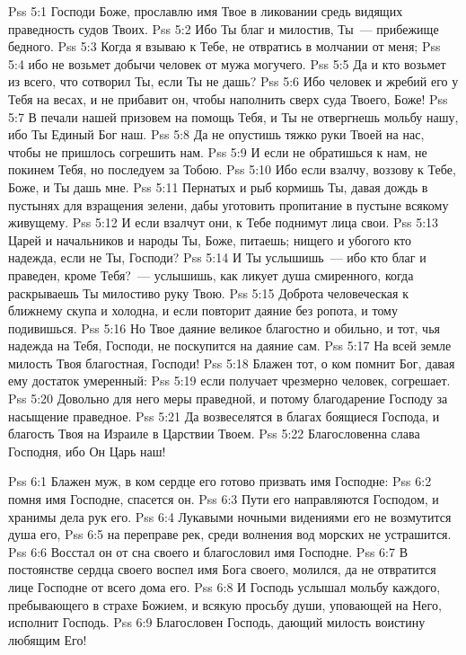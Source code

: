 \vs Pss 5:1
Господи Боже, прославлю имя Твое в ликовании средь видящих
праведность судов Твоих.
\vs Pss 5:2
Ибо Ты благ и милостив, Ты~--- прибежище бедного.
\vs Pss 5:3
Когда я взываю к Тебе, не отвратись в молчании от
меня;
\vs Pss 5:4
ибо не возьмет добычи человек от мужа могучего.
\vs Pss 5:5
Да и кто возьмет из всего, что сотворил Ты, если Ты не
дашь?
\vs Pss 5:6
Ибо человек и жребий его у Тебя на весах, и не прибавит он,
чтобы наполнить сверх суда Твоего, Боже!
\vs Pss 5:7
В печали нашей призовем на помощь Тебя, и Ты не отвергнешь
мольбу нашу, ибо Ты Единый Бог наш.
\vs Pss 5:8
Да не опустишь тяжко руки Твоей на нас, чтобы не пришлось
согрешить нам.
\vs Pss 5:9
И если не обратишься к нам, не покинем Тебя, но последуем за
Тобою.
\vs Pss 5:10
Ибо если взалчу, воззову к Тебе, Боже, и Ты дашь мне.
\vs Pss 5:11
Пернатых и рыб кормишь Ты, давая дождь в пустынях для взращения
зелени, дабы уготовить пропитание в пустыне всякому живущему.
\vs Pss 5:12
И если взалчут они, к Тебе поднимут лица свои.
\vs Pss 5:13
Царей и начальников и народы Ты, Боже, питаешь; нищего и убогого кто
надежда, если не Ты, Господи?
\vs Pss 5:14
И Ты услышишь~--- ибо кто благ и праведен, кроме Тебя?~--- услышишь,
как ликует душа смиренного, когда раскрываешь Ты милостиво руку
Твою.
\vs Pss 5:15
Доброта человеческая к ближнему скупа и холодна, и если повторит
даяние без ропота, и тому подивишься.
\vs Pss 5:16
Но Твое даяние великое благостно и обильно, и тот, чья надежда на
Тебя, Господи, не поскупится на даяние сам.
\vs Pss 5:17
На всей земле милость Твоя благостная, Господи!
\vs Pss 5:18
Блажен тот, о ком помнит Бог, давая ему достаток умеренный:
\vs Pss 5:19
если получает чрезмерно человек, согрешает.
\vs Pss 5:20
Довольно для него меры праведной, и потому благодарение Господу за
насыщение праведное.
\vs Pss 5:21
Да возвеселятся в благах боящиеся Господа, и благость Твоя на
Израиле в Царствии Твоем.
\vs Pss 5:22
Благословенна слава Господня, ибо Он Царь наш!

\vs Pss 6:1
Блажен муж, в ком сердце его готово призвать имя Господне:
\vs Pss 6:2
помня имя Господне, спасется он.
\vs Pss 6:3
Пути его направляются Господом, и хранимы дела рук его.
\vs Pss 6:4
Лукавыми ночными видениями его не возмутится душа его,
\vs Pss 6:5
на переправе рек, среди волнения вод морских не устрашится.
\vs Pss 6:6
Восстал он от сна своего и благословил имя Господне.
\vs Pss 6:7
В постоянстве сердца своего воспел имя Бога своего, молился, да
не отвратится лице Господне от всего дома его.
\vs Pss 6:8
И Господь услышал мольбу каждого, пребывающего в страхе Божием,
и всякую просьбу души, уповающей на Него, исполнит Господь.
\vs Pss 6:9
Благословен Господь, дающий милость воистину любящим Его!


